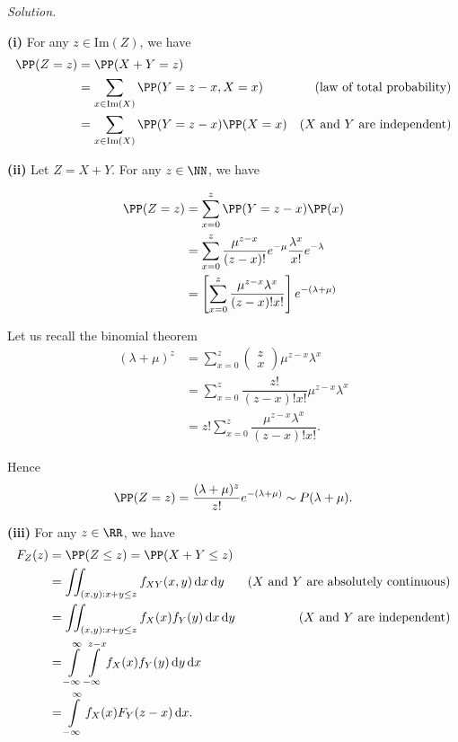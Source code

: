 \textit{Solution.}

\textbf{(i)} For any $z\in\mathrm{Im}(Z)$, we have
\begin{align*}
    \PP(Z=z) &= \PP(X+Y=z) \\
        &= \sum\limits_{x\in\mathrm{Im}(X)}\PP(Y=z-x, X=x) & \text{(law of total probability)}\\
        &= \sum\limits_{x\in\mathrm{Im}(X)}\PP(Y=z-x) \PP(X=x) & \text{($X$ and $Y$ are independent)}
\end{align*}

\textbf{(ii)} Let $Z=X+Y$. For any $z\in\NN$, we have

\begin{align*}
    \PP(Z=z) &= \sum\limits_{x=0}^z \PP(Y=z-x)\PP(x)\\
    &= \sum\limits_{x=0}^z \dfrac{\mu^{z-x}}{(z-x)!}e^{-\mu} \dfrac{\lambda^{x}}{x!}e^{-\lambda}\\
    &=\left[\sum\limits_{x=0}^z \dfrac{\mu^{z-x}\lambda^{x}}{(z-x)!x!}\right]e^{-(\lambda+\mu)}
\end{align*}

Let us recall the binomial theorem
\begin{align*}
 (\lambda+\mu)^z 
 &= \sum\limits_{x=0}^z \begin{pmatrix}
    z \\ x
\end{pmatrix} \mu^{z-x}\lambda^x\\ 
&= \sum\limits_{x=0}^z \dfrac{z!}{(z-x)!x!} \mu^{z-x}\lambda^x\\
&=z!\sum\limits_{x=0}^z \dfrac{\mu^{z-x}\lambda^x}{(z-x)!x!}. 
\end{align*}

Hence 
$$\PP(Z=z)=\dfrac{(\lambda+\mu)^z}{z!}e^{-(\lambda+\mu)}\sim P(\lambda+\mu).$$

\textbf{(iii)} For any $z\in\RR$, we have
\begin{align*}
    F_Z(z) 
    &= \PP(Z\le z) = \PP(X+Y\le z)\\ 
    &= \iint_{{(x,y):x+y\le z}} f_{XY}(x,y)\,\mathrm{d}x\,\mathrm{d}y & (\text{$X$ and $Y$ are absolutely continuous})\\
    &= \iint_{{(x,y):x+y\le z}} f_{X}(x) f_{Y}(y)\,\mathrm{d}x\,\mathrm{d}y & (\text{$X$ and $Y$ are independent})\\
    &= \int\limits_{-\infty}^{\infty} \int\limits_{-\infty}^{z-x} f_X(x) f_Y(y) \,\mathrm{d}y  \,\mathrm{d}x \\
    &= \int\limits_{-\infty}^{\infty} f_X(x) F_Y(z-x) \,\mathrm{d}x.
\end{align*}

